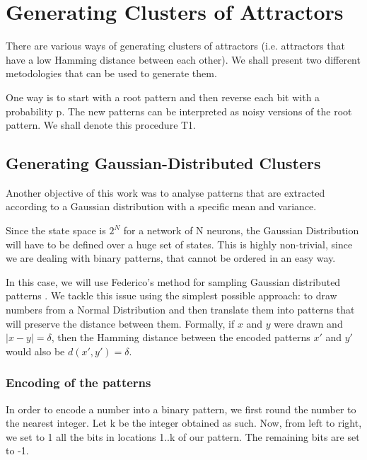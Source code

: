  

\section{Generating Clusters of Attractors}

There are various ways of generating clusters of attractors (i.e. attractors that have a low Hamming distance between each other). We shall present two different metodologies that can be used to generate them. 

One way is to start with a root pattern and then reverse each bit with a probability p. The new patterns can be interpreted as noisy versions of the root pattern. We shall denote this procedure T1.

\subsection{Generating Gaussian-Distributed Clusters}

Another objective of this work was to analyse patterns that are extracted according to a Gaussian distribution with a specific mean and variance. 


Since the state space is \( 2^N \) for a network of N neurons, the Gaussian Distribution will have to be defined over a huge set of states. This is highly non-trivial, since we are dealing with binary patterns, that cannot be ordered in an easy way. 

In this case, we will use Federico's method for sampling Gaussian distributed patterns \cite[p.~33]{federico}. We tackle this issue using the simplest possible approach: to draw numbers from a Normal Distribution and then translate them into patterns that will preserve the distance between them. Formally, if \(x\) and \(y\) were drawn and \( |x-y|=\delta\), then the Hamming distance between the encoded patterns \(x'\) and \(y'\) would also be \( d(x',y')=\delta\).

\subsubsection{Encoding of the patterns}

In order to encode a number into a binary pattern, we first round the number to the nearest integer. Let k be the integer obtained as such. Now, from left to right, we set to 1 all the bits in locations 1..k of our pattern. The remaining bits are set to -1. 

